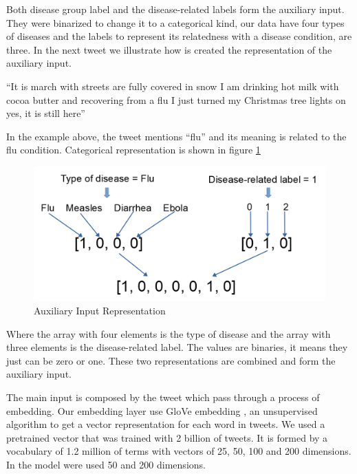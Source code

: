 \documentclass[12pt]{report}
\begin{document}
Both disease group label and the disease-related labels form the auxiliary input. They were binarized to change it to a categorical kind, our data have four types of diseases and the labels to represent its relatedness with a disease condition, are three. In the next tweet we illustrate how is created the representation of the auxiliary input.

\begin{definition}
	``It is march with streets are fully covered in snow I am drinking hot milk with cocoa butter and recovering from a flu I just turned my Christmas tree lights on yes, it is still here''
\end{definition}

In the example above, the tweet mentions ``flu'' and its meaning is related to the flu condition. Categorical representation is shown in figure \ref{figure:categorical}

\begin{figure}[H]	
	\centering
	\includegraphics[width=130mm, scale = 1]{images/10_categorical.png}	
	\caption{Auxiliary Input Representation}	
	\label{figure:categorical}
\end{figure}

\noindent Where the array with four elements is the type of disease and the array with three elements is the disease-related label. The values are binaries, it means they just can be zero or one. These two representations are combined and form the auxiliary input.

The main input is composed by the tweet which pass through a process of embedding. Our embedding layer use GloVe embedding \cite{Pennington2014}, an unsupervised algorithm to get a vector representation for each word in tweets. We used a pretrained vector that was trained with 2 billion of tweets. It is formed by a vocabulary of 1.2 million of terms with vectors of 25, 50, 100 and 200 dimensions. In the model were used 50 and 200 dimensions.
\end{document}
